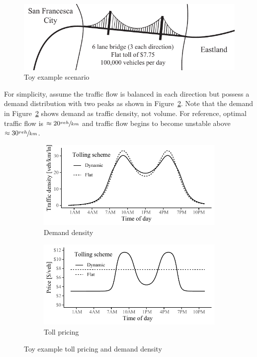 \documentclass{article}
\begin{document}
 \begin{figure}[h]
 	\centering
 	\includegraphics[width=0.75\linewidth]{figures/silvergate}
 	\caption{Toy example scenario}
 	\label{fig:toymap}
 \end{figure}
 
 \noindent For simplicity, assume the traffic flow is balanced in each direction but possess a demand distribution with two peaks as shown in Figure~\ref{fig:toydem}. Note that the demand in Figure~\ref{fig:toydem} shows demand as traffic density, not volume. For reference, optimal traffic flow is $\approx 20 \sfrac{veh}{km}$ and traffic flow begins to become unstable above $\approx 30 \sfrac{veh}{km}$.
   
 \begin{figure}[h]
     \begin{subfigure}[h]{\linewidth}
     	\centering
     	\includegraphics[width=\textwidth]{figures/toydemand}
     	\caption{Demand density}
     	\label{fig:toydem}
     \end{subfigure}
     \begin{subfigure}[h]{\linewidth}
     	\centering
     	\includegraphics[width=\textwidth]{figures/toytoll}
     	\caption{Toll pricing}
     	\label{fig:toytoll}
     \end{subfigure}
     \caption{Toy example toll pricing and demand density}
     \label{fig:toymodel}
 \end{figure}
 
\end{document}
